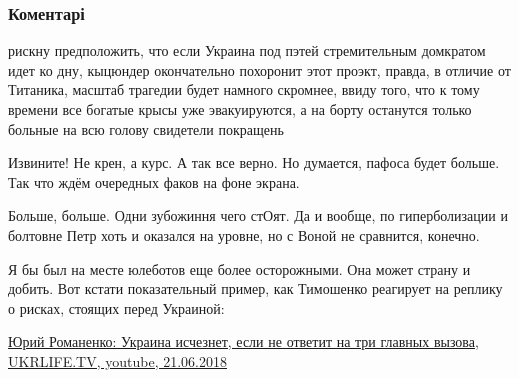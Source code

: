  
 
 
 
 
\subsubsection{Коментарі}
\label{sec:22_06_2018.fb.lesev_igor.1.juleboty.cmt}

\begin{itemize} %

рискну предположить, что если Украина под пэтей стремительным домкратом идет ко
дну, кыцюндер окончательно похоронит этот проэкт, правда, в отличие от
Титаника, масштаб трагедии будет намного скромнее, ввиду того, что к тому времени
все богатые крысы уже эвакуируются, а на борту останутся только больные на всю
голову свидетели покращень


Извините! Не крен, а курс. А так все верно. Но думается, пафоса будет больше. Так что ждём очередных факов на фоне экрана.


Больше, больше. Одни зубожиння чего стОят. Да и вообще, по гиперболизации и
болтовне Петр хоть и оказался на уровне, но с Воной не сравнится, конечно.


Я бы был на месте юлеботов еще более осторожными. Она может страну и добить.
Вот кстати показательный пример, как Тимошенко реагирует на реплику о рисках,
стоящих перед Украиной: 

\href{https://www.youtube.com/watch?v=qSjCyrDKu-4&t=322s}{%
Юрий Романенко: Украина исчезнет, если не ответит на три главных вызова, %
UKRLIFE.TV, youtube, 21.06.2018%
}

\end{itemize} %

